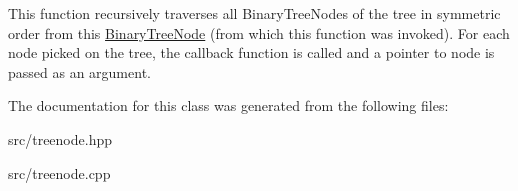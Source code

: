 This function recursively traverses all Binary\+Tree\+Nodes of the tree in symmetric order from this \hyperlink{classDataJuggler_1_1BinaryTreeNode}{Binary\+Tree\+Node} (from which this function was invoked). For each node picked on the tree, the callback function is called and a pointer to node is passed as an argument. 

The documentation for this class was generated from the following files\+:\begin{DoxyCompactItemize}
\item 
src/treenode.\+hpp\item 
src/treenode.\+cpp\end{DoxyCompactItemize}
